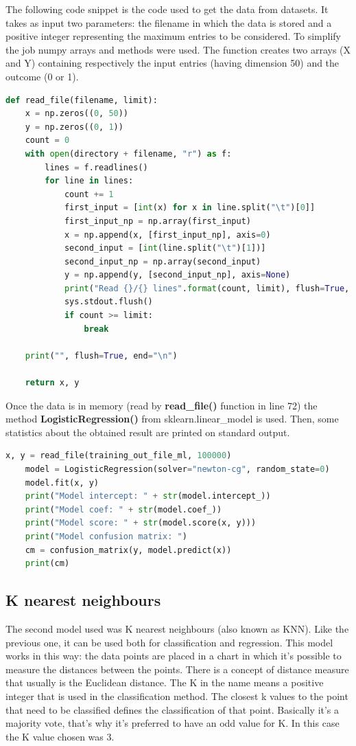 The following code snippet is the code used to get the data from datasets. It takes as input two parameters: the filename in which the data is stored and a positive integer representing the maximum entries to be considered. To simplify the job numpy arrays and methods were used. The function creates two arrays (X and Y) containing respectively the input entries (having dimension 50) and the outcome (0 or 1).
\begin{lstlisting}[language=python,firstnumber=24]
def read_file(filename, limit):
    x = np.zeros((0, 50))
    y = np.zeros((0, 1))
    count = 0
    with open(directory + filename, "r") as f:
        lines = f.readlines()
        for line in lines:
            count += 1
            first_input = [int(x) for x in line.split("\t")[0]]
            first_input_np = np.array(first_input)
            x = np.append(x, [first_input_np], axis=0)
            second_input = [int(line.split("\t")[1])]
            second_input_np = np.array(second_input)
            y = np.append(y, [second_input_np], axis=None)
            print("Read {}/{} lines".format(count, limit), flush=True, end="\r")
            sys.stdout.flush()
            if count >= limit:
                break

    print("", flush=True, end="\n")

    return x, y
\end{lstlisting}

Once the data is in memory (read by \textbf{read\_file()} function in line 72) the method \textbf{LogisticRegression()} from sklearn.linear\_model is used. Then, some statistics about the obtained result are printed on standard output.
\begin{lstlisting}[language=python,firstnumber=72]
    x, y = read_file(training_out_file_ml, 100000)
    model = LogisticRegression(solver="newton-cg", random_state=0)
    model.fit(x, y)
    print("Model intercept: " + str(model.intercept_))
    print("Model coef: " + str(model.coef_))
    print("Model score: " + str(model.score(x, y)))
    print("Model confusion matrix: ")
    cm = confusion_matrix(y, model.predict(x))
    print(cm)
\end{lstlisting}


\subsection{K nearest neighbours}
The second model used was K nearest neighbours (also known as KNN). Like the previous one, it can be used both for classification and regression. This model works in this way: the data points are placed in a chart in which it's possible to measure the distances between the points. There is a concept of distance measure that usually is the Euclidean distance. The K in the name means a positive integer that is used in the classification method. The closest k values to the point that need to be classified defines the classification of that point. Basically it's a majority vote, that's why it's preferred to have an odd value for K. In this case the K value chosen was 3.
\medskip

